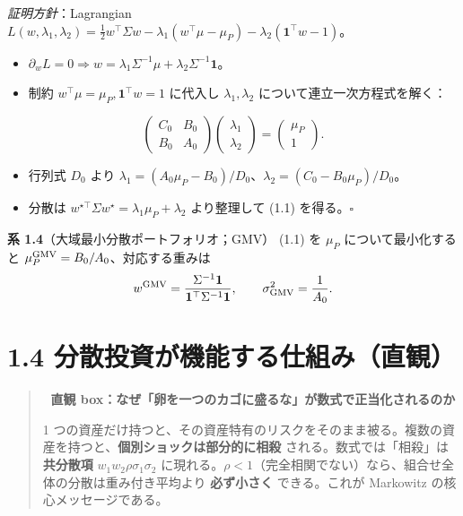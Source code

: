 \documentclass[11pt,a4paper]{report}
\begin{document}
\emph{証明方針}：Lagrangian $L(w, \lambda_1, \lambda_2) = \tfrac{1}{2} w^\top \Sigma w - \lambda_1 (w^\top \mu - \mu_P) - \lambda_2(\mathbf{1}^\top w - 1)$。
\begin{itemize}
\item $\partial_w L = 0 \Rightarrow w = \lambda_1 \Sigma^{-1}\mu + \lambda_2 \Sigma^{-1}\mathbf{1}$。
\item 制約 $w^\top \mu = \mu_P, \mathbf{1}^\top w = 1$ に代入し $\lambda_1, \lambda_2$ について連立一次方程式を解く：
\end{itemize}
\[ \begin{pmatrix} C_0 & B_0 \\ B_0 & A_0 \end{pmatrix} \begin{pmatrix} \lambda_1 \\ \lambda_2 \end{pmatrix} = \begin{pmatrix} \mu_P \\ 1 \end{pmatrix}. \]
\begin{itemize}
\item 行列式 $D_0$ より $\lambda_1 = (A_0 \mu_P - B_0)/D_0$、$\lambda_2 = (C_0 - B_0 \mu_P)/D_0$。
\item 分散は $w^{\star\top}\Sigma w^\star = \lambda_1 \mu_P + \lambda_2$ より整理して (1.1) を得る。$\square$
\end{itemize}

\textbf{系 1.4}（大域最小分散ポートフォリオ；GMV） (1.1) を $\mu_P$ について最小化すると $\mu_P^{\rm GMV} = B_0 / A_0$、対応する重みは \[ w^{\rm GMV} = \frac{\Sigma^{-1} \mathbf{1}}{\mathbf{1}^\top \Sigma^{-1} \mathbf{1}}, \qquad \sigma_{\rm GMV}^2 = \frac{1}{A_0}. \]

\section{1.4 分散投資が機能する仕組み（直観）}

\begin{quote}
🎯 \textbf{直観 box：なぜ「卵を一つのカゴに盛るな」が数式で正当化されるのか}

1 つの資産だけ持つと、その資産特有のリスクをそのまま被る。複数の資産を持つと、\textbf{個別ショックは部分的に相殺} される。数式では「相殺」は \textbf{共分散項} $w_1 w_2 \rho \sigma_1 \sigma_2$ に現れる。$\rho < 1$（完全相関でない）なら、組合せ全体の分散は重み付き平均より \textbf{必ず小さく} できる。これが Markowitz の核心メッセージである。
\end{quote}
\end{document}
